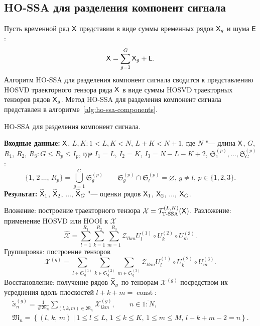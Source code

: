 \documentclass[specialist,
  substylefile=spbu_report.rtx,
subf,href,colorlinks=true, 12pt]{disser}
\theoremstyle{plain}
\theoremstyle{definition}
\theoremstyle{remark}
\newcommand{\Input}{\textbf{Входные данные: }}
\newcommand{\Output}{\textbf{Результат: }}
\begin{document}
\subsection{HO-SSA для разделения компонент сигнала}\label{ho-ssa-sep}
Пусть временной ряд $\mathsf{X}$ представим в виде суммы временных рядов
$\mathsf{X}_g$ и шума $\mathsf{E}$:
\[
  \mathsf{X} = \sum_{g=1}^{G} \mathsf{X}_g + \mathsf{E}.
\]
Алгоритм HO-SSA для разделения компонент сигнала сводится к
представлению \linebreak HOSVD траекторного тензора ряда
$\mathsf{X}$ в виде суммы HOSVD траекторных тензоров рядов $\mathsf{X}_g$.
Метод HO-SSA для разделения компонент сигнала представлен в
алгоритме~\ref{alg:ho-ssa-components}.
\begin{algorithm}[!ht]
  \caption{HO-SSA для разделения компонент сигнала.}
  \label{alg:ho-ssa-components}
  \Input $\mathsf{X}$, $L,K: 1< L,K < N,\, L + K < N + 1$, где $N$ "--- длина $\mathsf{X}$,
  $G$, \linebreak $R_1$, $R_2$, $R_3: G \leqslant R_p\leqslant
  I_p$, где $I_1 = L$, $I_2 = K$, $I_3 = N - L - K + 2$,
  $\mathfrak{S}_1^{(p)}, \ldots, \mathfrak{S}_G^{(p)}$:
  \[
    \{1,\, 2\,\ldots,\, R_p\}=\bigcup_{g=1}^{G}\mathfrak{S}_g^{(p)} \qquad
    \mathfrak{S}_g^{(p)}\cap \mathfrak{S}_l^{(p)} =\varnothing,\,
    g\ne l,\, p \in \{1, 2, 3\}.
  \]
  \Output $\widetilde{\mathsf{X}}_1$, $\widetilde{\mathsf{X}}_2$, $\ldots$,
  $\widetilde{\mathsf{X}}_G$ "--- оценки рядов
  $\mathsf{X}_1$, $\mathsf{X}_2$, $\ldots$, $\mathsf{X}_G$.
  \begin{algorithmic}[1]
    \State \label{algstep:ho-ssa-inj}
    Вложение: построение траекторного тензора $\mathcal{X}
    =\mathcal{T}_{\textrm{T-SSA}}^{(L, K)} (\mathsf{X})$.
    \State \label{algstep:ho-ssa-decomp}
    Разложение: применение HOSVD или HOOI к $\mathcal{X}$
    \begin{equation}
      \widehat{\mathcal{X}}=\sum_{l=1}^{R_1} \sum_{k=1}^{R_2} \sum_{m=1}^{R_3}
      \mathcal{Z}_{lkm} U^{(1)}_{l}
      \circ U^{(2)}_{k} \circ U^{(3)}_{m}.
      \label{eq:trajectory-hosvd}
    \end{equation}
    \State Группировка: построение тензоров
    \begin{equation*}
      \mathcal{X}^{(g)}=\sum_{l \in \mathfrak{S}_g^{(1)}} \sum_{k\in
      \mathfrak{S}_g^{(2)}}
      \sum_{m\in \mathfrak{S}_g^{(3)}}
      \mathcal{Z}_{lkm} U^{(1)}_{l}\circ U^{(2)}_{k} \circ U^{(3)}_{m}.
    \end{equation*}
    \State Восстановление: получение рядов $\widetilde{\mathsf{X}}_g$ по тензорам
    $\mathcal{X}^{(g)}$ посредством их усреднения вдоль
    плоскостей $l+k+m=\operatorname{const}$:
    \begin{gather*}
      \tilde{x}^{(g)}_n=\frac{1}{\#\mathfrak{M}_n}\sum_{(l,k,m)\in
      \mathfrak{M}_n} \mathcal{X}^{(g)}_{lkm},\qquad n\in
      \overline{1:N},         \\
      \mathfrak{M}_n=\left\{(l,\, k,\, m)~\Big|~1\leqslant l
        \leqslant L,\, 1\leqslant k \leqslant K,\, 1\leqslant m
      \leqslant M,\, l+k+m-2=n\right\}.
    \end{gather*}
  \end{algorithmic}
\end{algorithm}
\end{document}
